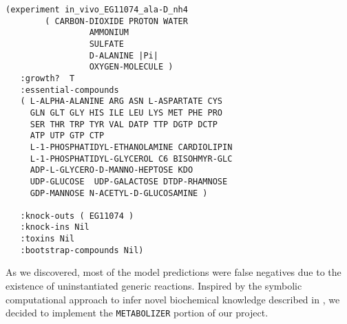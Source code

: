 \begin{lstlisting}[label={listing:biolog-experiments},caption={{\em E. coli} conditional essentiality experiments}]
(experiment in_vivo_EG11074_ala-D_nh4 
	    ( CARBON-DIOXIDE PROTON WATER 
			     AMMONIUM 
			     SULFATE 
			     D-ALANINE |Pi| 
			     OXYGEN-MOLECULE )
   :growth?  T
   :essential-compounds 
   ( L-ALPHA-ALANINE ARG ASN L-ASPARTATE CYS
     GLN GLT GLY HIS ILE LEU LYS MET PHE PRO 
     SER THR TRP TYR VAL DATP TTP DGTP DCTP 
     ATP UTP GTP CTP 
     L-1-PHOSPHATIDYL-ETHANOLAMINE CARDIOLIPIN
     L-1-PHOSPHATIDYL-GLYCEROL C6 BISOHMYR-GLC
     ADP-L-GLYCERO-D-MANNO-HEPTOSE KDO 
     UDP-GLUCOSE  UDP-GALACTOSE DTDP-RHAMNOSE 
     GDP-MANNOSE N-ACETYL-D-GLUCOSAMINE )

   :knock-outs ( EG11074 )
   :knock-ins Nil
   :toxins Nil
   :bootstrap-compounds Nil)

\end{lstlisting}

As we discovered, most of the model predictions were false negatives
due to the existence of uninstantiated generic reactions. Inspired by
the symbolic computational approach to infer novel biochemical
knowledge described in \cite{McShan2004}, we decided to implement the
{\tt METABOLIZER} portion of our project.

